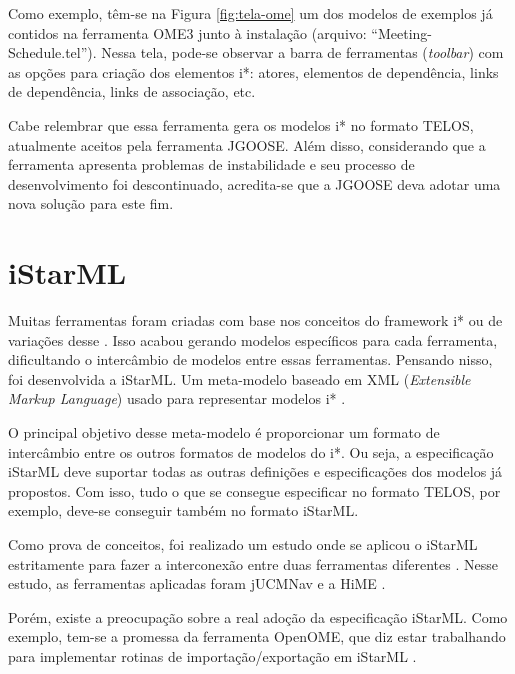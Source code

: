                 Como exemplo, têm-se na Figura \ref{fig:tela-ome} um dos modelos de exemplos já contidos na ferramenta OME3 junto à instalação (arquivo: ``Meeting-Schedule.tel'').
                Nessa tela, pode-se observar a barra de ferramentas (\emph{toolbar}) com as opções para criação dos elementos i*: atores, elementos de dependência, links  de  dependência, links  de  associação, etc.

                Cabe relembrar que essa ferramenta gera os modelos i* no formato TELOS, atualmente aceitos pela ferramenta JGOOSE.
                Além disso, considerando que a ferramenta apresenta problemas de instabilidade e seu processo de desenvolvimento foi descontinuado, acredita-se que a JGOOSE deva adotar uma nova solução para este fim.


    \section{iStarML}
            Muitas ferramentas foram criadas com base nos conceitos do framework i* ou de variações desse \cite{cares2012towards} \cite{cares2011towards}.
            Isso acabou gerando modelos específicos para cada ferramenta, dificultando o intercâmbio de modelos entre essas ferramentas.
            Pensando nisso, foi desenvolvida a iStarML.
            Um meta-modelo baseado em XML (\emph{Extensible Markup Language}) usado para representar modelos i* \cite{cares2008istarml}.
            
            O principal objetivo desse meta-modelo é proporcionar um formato de intercâmbio entre os outros formatos de modelos do i*.
            Ou seja, a especificação iStarML deve suportar todas as outras definições e especificações dos modelos já propostos.
            Com isso, tudo o que se consegue especificar no formato TELOS, por exemplo, deve-se conseguir também no formato iStarML.

            Como prova de conceitos, foi realizado um estudo onde se aplicou o iStarML estritamente para fazer a interconexão entre duas ferramentas diferentes \cite{colomer2011model}.
            Nesse estudo, as ferramentas aplicadas foram jUCMNav \cite{kealey2006integrating} e a HiME \cite{lopez2009hime}.

            Porém, existe a preocupação sobre a real adoção da especificação iStarML. Como exemplo, tem-se a promessa da ferramenta OpenOME, que diz estar trabalhando para implementar rotinas de importação/exportação em iStarML \cite{horkoff2011openome} \cite{laue2011adding}.

